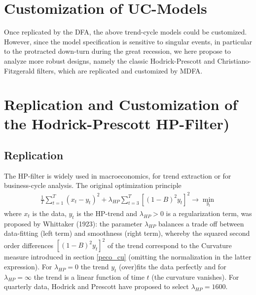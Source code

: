 \documentclass[a4paper]{book}
\begin{document}
\section{Customization of UC-Models}\label{cust_uc_mod}

Once replicated by the DFA, the above trend-cycle models could be customized. However, since the model specification is sensitive to singular events, in particular to the protracted down-turn during the great recession, we here propose to analyze more robust designs, namely the classic Hodrick-Prescott and Christiano-Fitzgerald filters, which are replicated and customized by MDFA. 






\section{Replication and Customization of the Hodrick-Prescott HP-Filter)}\label{rep_cust_cl_fi_d}

\subsection{Replication}


The HP-filter is widely used in macroeconomics, for trend extraction or for business-cycle analysis. The original optimization principle 
\begin{eqnarray*}
\frac{1}{T} \sum_{t=1}^T (x_t-y_t)^2+\lambda_{HP} \sum_{t=3}^T [(1-B)^2y_t]^2\to \min_{y_t}
\end{eqnarray*}
where $x_t$ is the data, $y_t$ is the HP-trend and $\lambda_{HP}>0$ is a regularization term, was proposed by Whittaker (1923): the parameter $\lambda_{HP}$ balances a trade off between data-fitting (left term) and smoothness (right term), whereby the squared second order differences $[(1-B)^2y_t]^2$ of the trend correspond to the Curvature measure introduced in section \ref{peco_cu} (omitting the normalization in the latter expression). For $\lambda_{HP}=0$ the trend $y_t$ (over)fits the data perfectly and for $\lambda_{HP}=\infty$ the trend is a linear function of time $t$ (the curvature vanishes). For quarterly data, Hodrick and Prescott have proposed to select $\lambda_{HP}=1600$. \\
\end{document}
